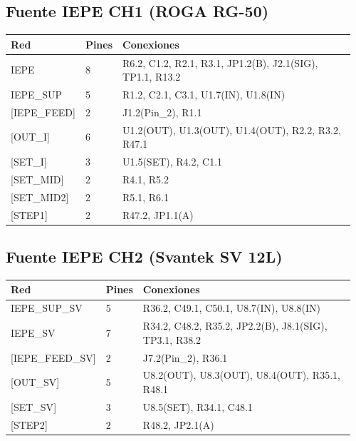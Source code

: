 \documentclass[10pt,a4paper]{article}
\begin{document}
\subsection*{Fuente IEPE CH1 (ROGA RG-50)}
{\footnotesize\begin{longtable}{@{}L{0.2\linewidth}L{0.06\linewidth}L{0.7\linewidth}@{}}\toprule
\textbf{Red} & \textbf{Pines} & \textbf{Conexiones}\\\midrule\endhead
IEPE & 8 & R6.2, C1.2, R2.1, R3.1, JP1.2(B), J2.1(SIG), TP1.1, R13.2\\
IEPE\_\allowbreak{}SUP & 5 & R1.2, C2.1, C3.1, U1.7(IN), U1.8(IN)\\
{[}IEPE\_\allowbreak{}FEED{]} & 2 & J1.2(Pin\_\allowbreak{}2), R1.1\\
{[}OUT\_\allowbreak{}I{]} & 6 & U1.2(OUT), U1.3(OUT), U1.4(OUT), R2.2, R3.2, R47.1\\
{[}SET\_\allowbreak{}I{]} & 3 & U1.5(SET), R4.2, C1.1\\
{[}SET\_\allowbreak{}MID{]} & 2 & R4.1, R5.2\\
{[}SET\_\allowbreak{}MID2{]} & 2 & R5.1, R6.1\\
{[}STEP1{]} & 2 & R47.2, JP1.1(A)\\
\bottomrule\end{longtable}}
\subsection*{Fuente IEPE CH2 (Svantek SV 12L)}
{\footnotesize\begin{longtable}{@{}L{0.2\linewidth}L{0.06\linewidth}L{0.7\linewidth}@{}}\toprule
\textbf{Red} & \textbf{Pines} & \textbf{Conexiones}\\\midrule\endhead
IEPE\_\allowbreak{}SUP\_\allowbreak{}SV & 5 & R36.2, C49.1, C50.1, U8.7(IN), U8.8(IN)\\
IEPE\_\allowbreak{}SV & 7 & R34.2, C48.2, R35.2, JP2.2(B), J8.1(SIG), TP3.1, R38.2\\
{[}IEPE\_\allowbreak{}FEED\_\allowbreak{}SV{]} & 2 & J7.2(Pin\_\allowbreak{}2), R36.1\\
{[}OUT\_\allowbreak{}SV{]} & 5 & U8.2(OUT), U8.3(OUT), U8.4(OUT), R35.1, R48.1\\
{[}SET\_\allowbreak{}SV{]} & 3 & U8.5(SET), R34.1, C48.1\\
{[}STEP2{]} & 2 & R48.2, JP2.1(A)\\
\bottomrule\end{longtable}}
\end{document}
